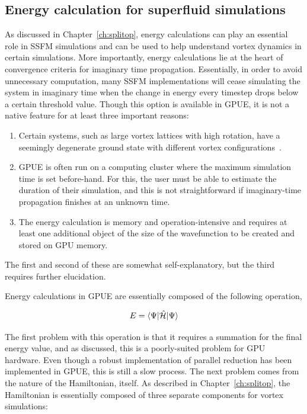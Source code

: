 \subsection{Energy calculation for superfluid simulations}

As discussed in Chapter~\ref{ch:splitop}, energy calculations can play an essential role in SSFM simulations and can be used to help understand vortex dynamics in certain simulations.
More importantly, energy calculations lie at the heart of convergence criteria for imaginary time propagation.
Essentially, in order to avoid unnecessary computation, many SSFM implementations will cease simulating the system in imaginary time when the change in energy every timestep drops below a certain threshold value.
Though this option is available in GPUE, it is not a native feature for at least three important reasons:

\begin{enumerate}
\item Certain systems, such as large vortex lattices with high rotation, have a seemingly degenerate ground state with different vortex configurations~\cite{o2017, o2016, o2016topo}.
\item GPUE is often run on a computing cluster where the maximum simulation time is set before-hand.
For this, the user must be able to estimate the duration of their simulation, and this is not straightforward if imaginary-time propagation finishes at an unknown time.
\item The energy calculation is memory and operation-intensive and requires at least one additional object of the size of the wavefunction to be created and stored on GPU memory.
\end{enumerate}

\noindent The first and second of these are somewhat self-explanatory, but the third requires further elucidation.

Energy calculations in GPUE are essentially composed of the following operation,

\begin{equation}
E = \braket{\Psi|\mathcal{\hat H}|\Psi}
\end{equation}

\noindent The first problem with this operation is that it requires a summation for the final energy value, and as discussed, this is a poorly-suited problem for GPU hardware.
Even though a robust implementation of parallel reduction has been implemented in GPUE, this is still a slow process.
The next problem comes from the nature of the Hamiltonian, itself.
As described in Chapter~\ref{ch:splitop}, the Hamiltonian is essentially composed of three separate components for vortex simulations:

